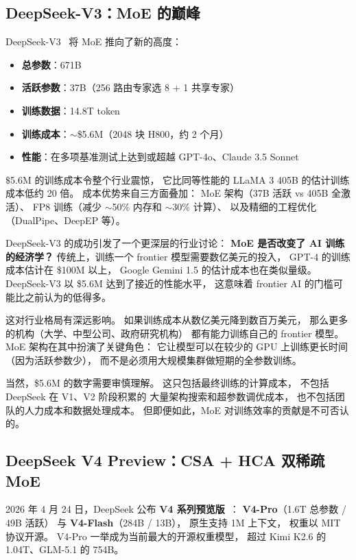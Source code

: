 \subsection{DeepSeek-V3：MoE 的巅峰}

DeepSeek-V3~\cite{deepseekv3} 将 MoE 推向了新的高度：
\begin{itemize}[noitemsep]
  \item \textbf{总参数}：671B
  \item \textbf{活跃参数}：37B（256 路由专家选 8 + 1 共享专家）
  \item \textbf{训练数据}：14.8T token
  \item \textbf{训练成本}：$\sim$\$5.6M（2048 块 H800，约 2 个月）
  \item \textbf{性能}：在多项基准测试上达到或超越 GPT-4o、Claude 3.5 Sonnet
\end{itemize}

$\$$5.6M 的训练成本令整个行业震惊，
它比同等性能的 LLaMA 3 405B 的估计训练成本低约 20 倍。
成本优势来自三方面叠加：
MoE 架构（37B 活跃 vs 405B 全激活）、
FP8 训练（减少 $\sim$50\% 内存和 $\sim$30\% 计算）、
以及精细的工程优化（DualPipe、DeepEP 等）。

DeepSeek-V3 的成功引发了一个更深层的行业讨论：
\textbf{MoE 是否改变了 AI 训练的经济学？}
传统上，训练一个 frontier 模型需要数亿美元的投入，
GPT-4 的训练成本估计在 \$100M 以上，
Google Gemini 1.5 的估计成本也在类似量级。
DeepSeek-V3 以 \$5.6M 达到了接近的性能水平，
这意味着 frontier AI 的门槛可能比之前认为的低得多。

这对行业格局有深远影响。
如果训练成本从数亿美元降到数百万美元，
那么更多的机构（大学、中型公司、政府研究机构）
都有能力训练自己的 frontier 模型。
MoE 架构在其中扮演了关键角色：
它让模型可以在较少的 GPU 上训练更长时间（因为活跃参数少），
而不是必须用大规模集群做短期的全参数训练。

当然，\$5.6M 的数字需要审慎理解。
这只包括最终训练的计算成本，
不包括 DeepSeek 在 V1、V2 阶段积累的
大量架构搜索和超参数调优成本，
也不包括团队的人力成本和数据处理成本。
但即便如此，MoE 对训练效率的贡献是不可否认的。

\subsection{DeepSeek V4 Preview：CSA + HCA 双稀疏 MoE}
\label{sec:deepseek-v4-moe}

2026 年 4 月 24 日，DeepSeek 公布
\textbf{V4 系列预览版}~\cite{deepseekv4preview2026}：
\textbf{V4-Pro}（1.6T 总参数 / 49B 活跃）
与 \textbf{V4-Flash}（284B / 13B），
原生支持 1M 上下文，
权重以 MIT 协议开源。
V4-Pro 一举成为当前最大的开源权重模型，
超过 Kimi K2.6 的 1.04T、GLM-5.1 的 754B。

